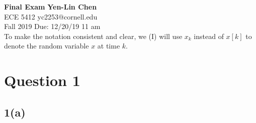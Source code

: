 \documentclass[a4paper, 11pt]{article}
\begin{document}
\noindent
\large\textbf{Final Exam} \hfill \textbf{Yen-Lin Chen} \\
\normalsize ECE 5412 \hfill yc2253@cornell.edu \\
Fall 2019 \hfill Due: 12/20/19 11 am\\

To make the notation consistent and clear, we (I) will use $x_k$ instead of $x[k]$ to denote the random variable $x$ at time $k$. 

\section*{Question 1}

\subsection*{1(a)}
\end{document}
